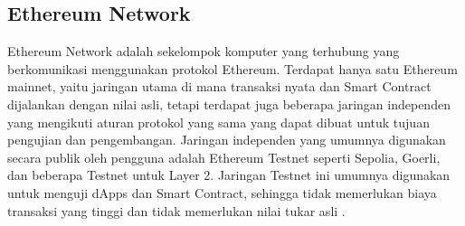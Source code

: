 \subsection{Ethereum Network}
\label{subsec:ethereum-network}

Ethereum Network adalah sekelompok komputer yang terhubung yang berkomunikasi menggunakan protokol Ethereum. Terdapat hanya satu Ethereum mainnet, yaitu jaringan utama di mana transaksi nyata dan Smart Contract dijalankan dengan nilai asli, tetapi terdapat juga beberapa jaringan independen yang mengikuti aturan protokol yang sama yang dapat dibuat untuk tujuan pengujian dan pengembangan. Jaringan independen yang umumnya digunakan secara publik oleh pengguna adalah Ethereum Testnet seperti Sepolia, Goerli, dan beberapa Testnet untuk Layer 2. Jaringan Testnet ini umumnya digunakan untuk menguji dApps dan Smart Contract, sehingga tidak memerlukan biaya transaksi yang tinggi dan tidak memerlukan nilai tukar asli \parencite{ethereum_networks}.